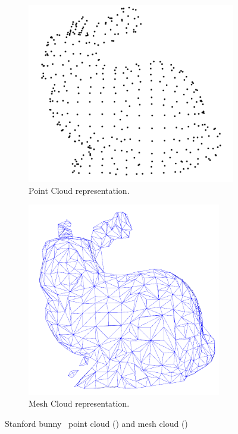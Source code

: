 \begin{figure}[!ht]
	\centering
	\begin{subfigure}[c]{0.45\textwidth}
	\includegraphics[width=\textwidth]{img/lidar/bunny_point.png}
		\caption{Point Cloud representation.}
		\label{fig:bunnyPointCloud}
	\end{subfigure}
	\quad
	\begin{subfigure}[c]{0.4\textwidth}
		\includegraphics[width=\textwidth]{img/lidar/bunny_mesh.png}
		\caption{Mesh Cloud representation.}
		\label{fig:bunnyMeshCloud}
	\end{subfigure}
	\caption[Example of a point and mesh clouds.]{Stanford bunny~\cite{bunny} point cloud () and mesh cloud ()}
	\label{fig:bunny}
\end{figure}

